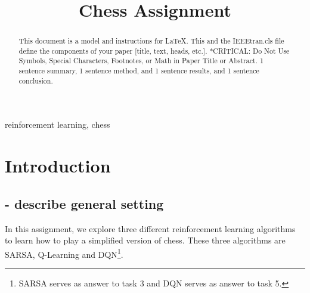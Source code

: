 \documentclass[conference]{IEEEtran}
\begin{document}
\title{Chess Assignment\\
}

\author{
}

\maketitle

\begin{abstract}
    \color{red}
    This document is a model and instructions for \LaTeX.
    This and the IEEEtran.cls file define the components of your paper [title, text, heads, etc.]. *CRITICAL: Do Not Use Symbols, Special Characters, Footnotes, 
    or Math in Paper Title or Abstract.
    1 sentence summary, 1 sentence method, and 1 sentence results, and 1 sentence conclusion.
\end{abstract}

\begin{IEEEkeywords}
    \color{red}
    reinforcement learning, chess
\end{IEEEkeywords}







\section{Introduction}\label{sec:introduction}

\subsection{- describe general setting}

In this assignment, we explore three different reinforcement learning algorithms to learn how to play a simplified version of chess. These three algorithms are SARSA, Q-Learning and DQN\footnote{SARSA serves as answer to task 3 and DQN serves as answer to task 5.}.
\end{document}
